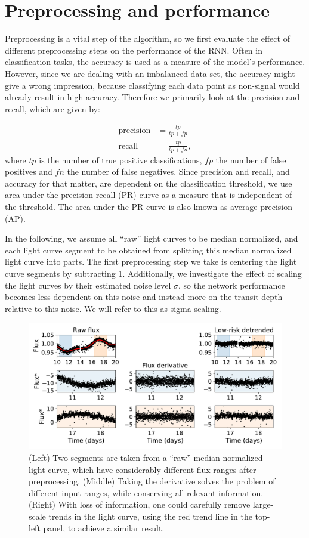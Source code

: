 
\section{Preprocessing and performance}
\label{sec:preprocessing}

Preprocessing is a vital step of the algorithm, so we first evaluate the effect of different preprocessing steps on the performance of the RNN. Often in classification tasks, the accuracy is used as a measure of the model's performance. However, since we are dealing with an imbalanced data set, the accuracy might give a wrong impression, because classifying each data point as non-signal would already result in high accuracy. Therefore we primarily look at the precision and recall, which are given by:

\begin{align}
    \text{precision} &= \frac{tp}{tp + fp}\\
    \text{recall} &= \frac{tp}{tp + fn},
\end{align}
where $tp$ is the number of true positive classifications, $fp$ the number of false positives and $fn$ the number of false negatives. Since precision and recall, and accuracy for that matter, are dependent on the classification threshold, we use area under the precision-recall (PR) curve as a measure that is independent of the threshold. The area under the PR-curve is also known as average precision (AP).

In the following, we assume all ``raw'' light curves to be median normalized, and each light curve segment to be obtained from splitting this median normalized light curve into parts. The first preprocessing step we take is centering the light curve segments by subtracting 1.  Additionally, we investigate the effect of scaling the light curves by their estimated noise level $\sigma$, so the network performance becomes less dependent on this noise and instead more on the transit depth relative to this noise. We will refer to this as sigma scaling.

\begin{figure}
    \centering
    \includegraphics[width=0.7\linewidth]{Experiments/Figures/Preprocessing/input-range-example.pdf}
    \caption{(Left) Two segments are taken from a ``raw'' median normalized light curve, which have considerably different flux ranges after preprocessing. (Middle) Taking the derivative solves the problem of different input ranges, while conserving all relevant information. (Right) With loss of information, one could carefully remove large-scale trends in the light curve, using the red trend line in the top-left panel, to achieve a similar result.}
    \label{fig:input_ranges}
\end{figure}


